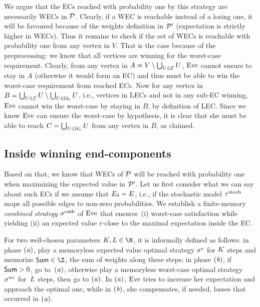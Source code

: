 We argue that the ECs reached with probability one by this strategy are necessarily WECs in ${\mathcal{P}}$. Clearly, if a WEC is reachable instead of a losing one, it will be favoured because of the weights definition in ${\mathcal{P}}'$ (expectation is strictly higher in WECs). Thus it remains to check if the set of WECs is reachable with probability one from any vertex in $V$. That is the case because of the preprocessing: we know that all vertices are winning for the worst-case requirement. Clearly, from any vertex in $A = V \setminus \bigcup_{U \in \mathcal{E}} U$, $\text{Eve}$ cannot ensure to stay in $A$ (otherwise it would form an EC) and thus must be able to win the worst-case requirement from reached ECs. Now for any vertex in $B = \bigcup_{U \in \mathcal{E}} U \setminus \bigcup_{U \in \mathcal{U}_{\textsc{w}}} U$, i.e., vertices in LECs and not in any sub-EC winning, $\text{Eve}$ cannot win the worst-case by staying in $B$, by definition of LEC. Since we know $\text{Eve}$ can ensure the worst-case by hypothesis, it is clear that she must be able to reach $C = \bigcup_{U \in \mathcal{U}_{\textsc{w}}} U$ from any vertex in $B$, as claimed.

\subsection*{Inside winning end-components} Based on that, we know that WECs of ${\mathcal{P}}$ will be reached with probability one when maximizing the expected value in ${\mathcal{P}}'$. Let us first consider what we can say about such ECs if we assume that $E_{\delta} = E$, i.e., if the stochastic model $\tau^{\text{stoch}}$ maps all possible edges to non-zero probabilities. 
We establish a finite-memory \textit{combined strategy} $\sigma^{\text{cmb}}$ of $\text{Eve}$ that ensures~(i) worst-case satisfaction while yielding (ii) an expected value $\varepsilon$-close to the maximal expectation inside the EC.

For two well-chosen parameters $\stepsExp, \stepsWC \in \N$, it is informally defined as follows: in phase $\mathit{(a)}$, play a memoryless expected value optimal strategy $\sigma^{\text{e}}$ for $K$ steps and memorize $\cmbSum \in \Z$, the sum of weights along these steps; in phase $\mathit{(b)}$, if $\mathsf{Sum} > 0$, go to~$\mathit{(a)}$, otherwise play a memoryless worst-case optimal strategy $\sigma^{\text{wc}}$ for~$L$ steps, then go to $\mathit{(a)}$. In $\mathit{(a)}$, $\text{Eve}$ tries to increase her expectation and approach the optimal one, while in $\mathit{(b)}$, she compensates, if needed, losses that occurred in $\mathit{(a)}$.

